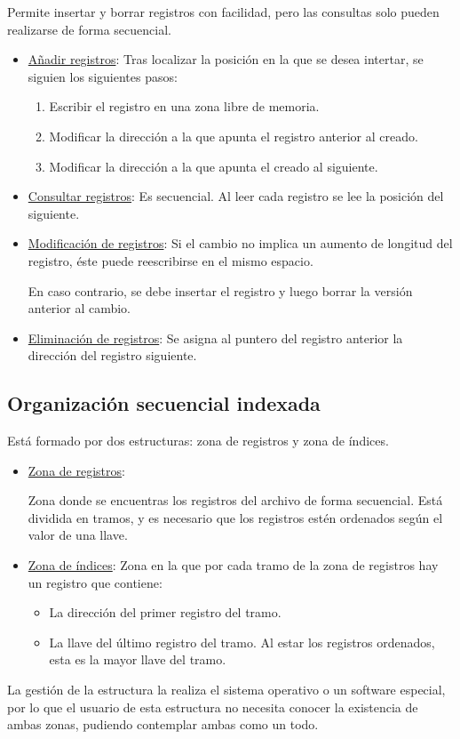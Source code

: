 Permite insertar y borrar registros con facilidad, pero las consultas solo pueden realizarse de forma secuencial.
\begin{itemize}
    \item \underline{Añadir registros}: Tras localizar la posición en la que se desea intertar, se siguien los siguientes pasos:
    \begin{enumerate}
        \item Escribir el registro en una zona libre de memoria.
        \item Modificar la dirección a la que apunta el registro anterior al creado.
        \item Modificar la dirección a la que apunta el creado al siguiente.
    \end{enumerate}
    
    \item \underline{Consultar registros}: Es secuencial. Al leer cada registro se lee la posición del siguiente.
    
    \item \underline{Modificación de registros}: Si el cambio no implica un aumento de longitud del registro, éste puede reescribirse en el mismo espacio.
    
    En caso contrario, se debe insertar el registro y luego borrar la versión anterior al cambio.
    
    \item \underline{Eliminación de registros}: Se asigna al puntero del registro anterior la dirección del registro siguiente.
\end{itemize}


\subsection{Organización secuencial indexada}

Está formado por dos estructuras: zona de registros y zona de índices.
\begin{itemize}
    \item \underline{Zona de registros}:

    Zona donde se encuentras los registros del archivo de forma secuencial. Está dividida en tramos, y es necesario que los registros estén ordenados según el valor de una llave.

    \item \underline{Zona de índices}: Zona en la que por cada tramo de la zona de registros hay un registro que contiene:
    \begin{itemize}
        \item La dirección del primer registro del tramo.
        \item La llave del último registro del tramo. Al estar los registros ordenados, esta es la mayor llave del tramo.
    \end{itemize}
\end{itemize}
La gestión de la estructura la realiza el sistema operativo o un software especial, por lo que el usuario de esta estructura no necesita conocer la existencia de ambas zonas, pudiendo contemplar ambas como un todo.


